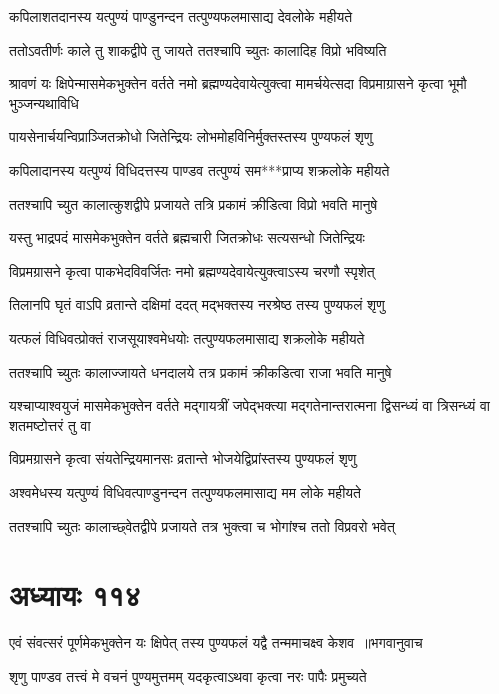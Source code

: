 \twolineshloka
{कपिलाशतदानस्य यत्पुण्यं पाण्डुनन्दन}
{तत्पुण्यफलमासाद्य देवलोके महीयते}


\twolineshloka
{ततोऽवतीर्णः काले तु शाकद्वीपे तु जायते}
{ततश्चापि च्युतः कालादिह विप्रो भविष्यति}


\threelineshloka
{श्रावणं यः क्षिपेन्मासमेकभुक्तेन वर्तते}
{नमो ब्रह्मण्यदेवायेत्युक्त्वा मामर्चयेत्सदा}
{विप्रमाग्रासने कृत्वा भूमौ भुञ्जन्यथाविधि}


\twolineshloka
{पायसेनार्चयन्विप्राञ्जितक्रोधो जितेन्द्रियः}
{लोभमोहविनिर्मुक्तस्तस्य पुण्यफलं शृणु}


\twolineshloka
{कपिलादानस्य यत्पुण्यं विधिदत्तस्य पाण्डव}
{तत्पुण्यं सम***प्राप्य शक्रलोके महीयते}


\twolineshloka
{ततश्चापि च्युत कालात्कुशद्वीपे प्रजायते}
{तत्रि प्रकामं क्रीडित्वा विप्रो भवति मानुषे}


\twolineshloka
{यस्तु भाद्रपदं मासमेकभुक्तेन वर्तते}
{ब्रह्मचारी जितक्रोधः सत्यसन्धो जितेन्द्रियः}


\twolineshloka
{विप्रमग्रासने कृत्वा पाकभेदविवर्जितः}
{नमो ब्रह्मण्यदेवायेत्युक्त्वाऽस्य चरणौ स्पृशेत्}


\twolineshloka
{तिलानपि घृतं वाऽपि व्रतान्ते दक्षिमां ददत्}
{मद्भक्तस्य नरश्रेष्ठ तस्य पुण्यफलं शृणु}


\twolineshloka
{यत्फलं विधिवत्प्रोक्तं राजसूयाश्वमेधयोः}
{तत्पुण्यफलमासाद्य शक्रलोके महीयते}


\twolineshloka
{ततश्चापि च्युतः कालाज्जायते धनदालये}
{तत्र प्रकामं क्रीकडित्वा राजा भवति मानुषे}


\threelineshloka
{यश्चाप्याश्वयुजं मासमेकभुक्तेन वर्तते}
{मद्गायत्रीं जपेद्भक्त्या मद्गतेनान्तरात्मना}
{द्विसन्ध्यं वा त्रिसन्ध्यं वा शतमष्टोत्तरं तु वा}


\twolineshloka
{विप्रमग्रासने कृत्वा संयतेन्द्रियमानसः}
{व्रतान्ते भोजयेद्विप्रांस्तस्य पुण्यफलं शृणु}


\twolineshloka
{अश्वमेधस्य यत्पुण्यं विधिवत्पाण्डुनन्दन}
{तत्पुण्यफलमासाद्य मम लोके महीयते}


\twolineshloka
{ततश्चापि च्युतः कालाच्छ्वेतद्वीपे प्रजायते}
{तत्र भुक्त्वा च भोगांश्च ततो विप्रवरो भवेत्}


\chapter{अध्यायः ११४}
\threelineshloka
{एवं संवत्सरं पूर्णमेकभुक्तेन यः क्षिपेत्}
{तस्य पुण्यफलं यद्वै तन्ममाचक्ष्व केशव ॥भगवानुवाच}
{}


\twolineshloka
{शृणु पाण्डव तत्त्वं मे वचनं पुण्यमुत्तमम्}
{यदकृत्वाऽथवा कृत्वा नरः पापैः प्रमुच्यते}


